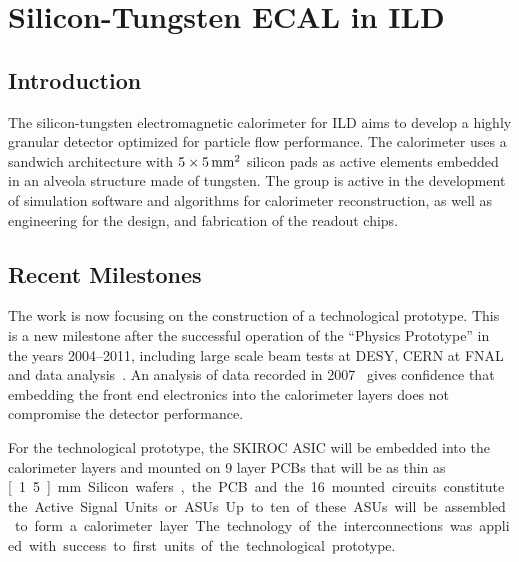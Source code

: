 \section{Silicon-Tungsten ECAL in ILD}

\subsection{Introduction}
The silicon-tungsten electromagnetic calorimeter for ILD aims to develop a highly granular detector optimized for particle flow performance. The calorimeter uses a sandwich architecture with $5 \times \unit[5]{mm^2}$ silicon pads as active elements embedded in an alveola structure made of tungsten. The group is active in the development of simulation software and algorithms for calorimeter reconstruction, as well as engineering for the design, and fabrication of the readout chips.

\subsection{Recent Milestones}
The work is now focusing on the construction of a technological prototype. This is a new milestone after the successful operation of the ``Physics Prototype'' in the years 2004--2011, including large scale beam tests at DESY, CERN at FNAL and data analysis~\cite{Adloff:CAN025}. An analysis of data recorded in 2007~\cite{Adloff201197} gives confidence that embedding the front end electronics into the calorimeter layers does not compromise the detector performance.

For the technological prototype, the SKIROC ASIC will be embedded into the calorimeter layers and mounted on 9 layer PCBs that will be as thin as \unit[1.5]{mm}. Silicon wafers, the PCB and the 16 mounted circuits constitute the Active Signal Units or ASUs. Up to ten of these ASUs will be assembled to form a calorimeter layer. The technology of the interconnections was applied with success to first units of the technological prototype.

